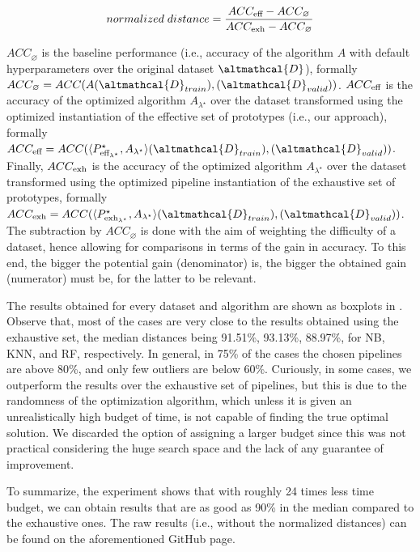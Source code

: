 \begin{equation*}
    normalized\;distance = \frac{ACC_{\textup{eff}} - ACC_{\varnothing}}{ACC_{\textup{exh}} - ACC_{\varnothing}}
\end{equation*}

$ACC_{\varnothing}$ is the baseline performance (i.e., accuracy of the algorithm $A$ with default hyperparameters over the original dataset $\altmathcal{D}$), formally $ACC_{\varnothing} = ACC(A(\altmathcal{D}_{train}), (\altmathcal{D}_{valid}))$.
$ACC_{\textup{eff}}$ is the accuracy of the optimized algorithm $A_{{\lambda}^{\star}}$ over the dataset transformed using the optimized instantiation of the effective set of prototypes (i.e., our approach), formally $ACC_{\textup{eff}} = ACC(\langle P^{\star}_{\textup{eff}_{{\lambda}^{\star}}}, A_{\lambda^\star} \rangle (\altmathcal{D}_{train}), (\altmathcal{D}_{valid}))$.
Finally, $ACC_{\textup{exh}}$ is the accuracy of the optimized algorithm $A_{{\lambda}^{\star}}$ over the dataset transformed using the optimized pipeline instantiation of the exhaustive set of prototypes, formally $ACC_{\textup{exh}} = ACC(\langle P^{\star}_{\textup{exh}_{{\lambda}^{\star}}}, A_{\lambda^\star} \rangle (\altmathcal{D}_{train}), (\altmathcal{D}_{valid}))$.
The subtraction by $ACC_{\varnothing}$ is done with the aim of weighting the difficulty of a dataset, hence allowing for comparisons in terms of the gain in accuracy.
To this end, the bigger the potential gain (denominator) is, the bigger the obtained gain (numerator) must be, for the latter to be relevant.

The results obtained for every dataset and algorithm are shown as boxplots in .
Observe that, most of the cases are very close to the results obtained using the exhaustive set, the median distances being 91.51\%, 93.13\%, 88.97\%, for NB, KNN, and RF, respectively.
In general, in 75\% of the cases the chosen pipelines are above 80\%, and only few outliers are below 60\%.
Curiously, in some cases, we outperform the results over the exhaustive set of pipelines, but this is due to the randomness of the optimization algorithm, which unless it is given an unrealistically high budget of time, is not capable of finding the true optimal solution.
We discarded the option of assigning a larger budget since this was not practical considering the huge search space and the lack of any guarantee of improvement.

To summarize, the experiment shows that with roughly 24 times less time budget, we can obtain results that are as good as 90\% in the median compared to the exhaustive ones.
The raw results (i.e., without the normalized distances) can be found on the aforementioned GitHub page.

